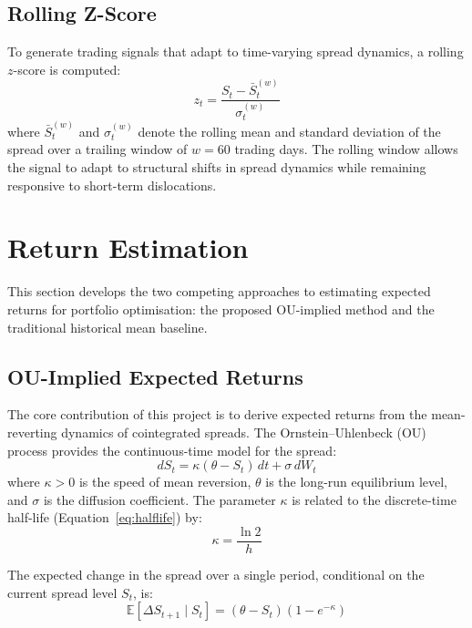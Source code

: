 \documentclass[a4paper]{report}
\begin{document}
\subsection{Rolling Z-Score}

To generate trading signals that adapt to time-varying spread dynamics, a rolling $z$-score is computed:
\begin{equation}
z_t = \frac{S_t - \bar{S}_t^{(w)}}{\sigma_t^{(w)}}
\label{eq:zscore}
\end{equation}
where $\bar{S}_t^{(w)}$ and $\sigma_t^{(w)}$ denote the rolling mean and standard deviation of the spread over a trailing window of $w = 60$ trading days. The rolling window allows the signal to adapt to structural shifts in spread dynamics while remaining responsive to short-term dislocations.

\section{Return Estimation}
\label{sec:return_estimation}

This section develops the two competing approaches to estimating expected returns for portfolio optimisation: the proposed OU-implied method and the traditional historical mean baseline.

\subsection{OU-Implied Expected Returns}

The core contribution of this project is to derive expected returns from the mean-reverting dynamics of cointegrated spreads. The Ornstein--Uhlenbeck (OU) process \cite{elliott2005} provides the continuous-time model for the spread:
\begin{equation}
dS_t = \kappa(\theta - S_t)\,dt + \sigma\,dW_t
\label{eq:ou_sde}
\end{equation}
where $\kappa > 0$ is the speed of mean reversion, $\theta$ is the long-run equilibrium level, and $\sigma$ is the diffusion coefficient. The parameter $\kappa$ is related to the discrete-time half-life (Equation~\ref{eq:halflife}) by:
\begin{equation}
\kappa = \frac{\ln 2}{h}
\label{eq:kappa}
\end{equation}

The expected change in the spread over a single period, conditional on the current spread level $S_t$, is:
\begin{equation}
\mathbb{E}[\Delta S_{t+1} \mid S_t] = (\theta - S_t)\left(1 - e^{-\kappa}\right)
\label{eq:ou_expected_return}
\end{equation}
\end{document}
